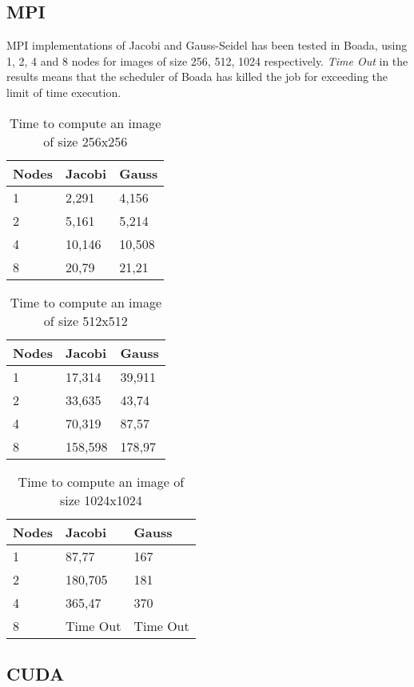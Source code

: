 \documentclass[a4paper, 10pt]{article}
\begin{document}
\clearpage
\subsection{MPI}

MPI implementations of Jacobi and Gauss-Seidel has been tested in Boada, using 1, 2, 4 and 8 nodes for images of size 256, 512, 1024 respectively. \textit{Time Out} in the results means that the scheduler of Boada has killed the job for exceeding the limit of time execution.

\begin{table}[ht]
\centering
\begin{tabular}{l|ll} 
\toprule
Nodes & Jacobi & Gauss   \\ 
\hline
1       & 2,291  & 4,156   \\
2       & 5,161  & 5,214   \\
4       & 10,146 & 10,508  \\
8       & 20,79  & 21,21   \\
\bottomrule
\end{tabular}
\caption{Time to compute an image of size 256x256}

\end{table}

\begin{table}[ht]
\centering
\begin{tabular}{l|ll} 
\toprule
  Nodes & Jacobi  & Gauss   \\ 
\hline
1       & 17,314  & 39,911  \\
2       & 33,635  & 43,74   \\
4       & 70,319  & 87,57   \\
8       & 158,598 & 178,97  \\
\bottomrule
\end{tabular}
\caption{Time to compute an image of size 512x512}
\end{table}

\begin{table}[ht]
\centering
\begin{tabular}{l|ll} 
\toprule
Nodes & Jacobi  & Gauss    \\ 
\hline
1     & 87,77   & 167      \\
2     & 180,705 & 181      \\
4     & 365,47  & 370      \\
  8     & Time Out & Time Out  \\
\bottomrule
\end{tabular}
\caption{Time to compute an image of size 1024x1024}
\end{table}
\clearpage
\subsection{CUDA}
\end{document}
